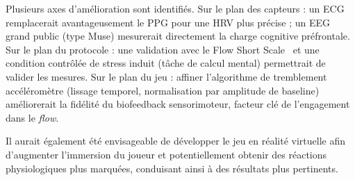 \documentclass[runningheads]{llncs}
\begin{document}
Plusieurs axes d'amélioration sont identifiés. Sur le plan des capteurs :
un ECG remplacerait avantageusement le PPG pour une HRV plus précise ;
un EEG grand public (type Muse) mesurerait directement la charge cognitive
préfrontale. Sur le plan du protocole : une validation avec le Flow Short
Scale~\cite{engeser2008} et une condition contrôlée de stress induit
(tâche de calcul mental) permettrait de valider les mesures. Sur le plan
du jeu : affiner l'algorithme de tremblement accéléromètre (lissage temporel,
normalisation par amplitude de baseline) améliorerait la fidélité du
biofeedback sensorimoteur, facteur clé de l'engagement dans le \textit{flow}.

Il aurait également été envisageable de développer le jeu en réalité virtuelle afin d’augmenter l’immersion du joueur et potentiellement obtenir des réactions physiologiques plus marquées, conduisant ainsi à des résultats plus pertinents.



\end{document}
